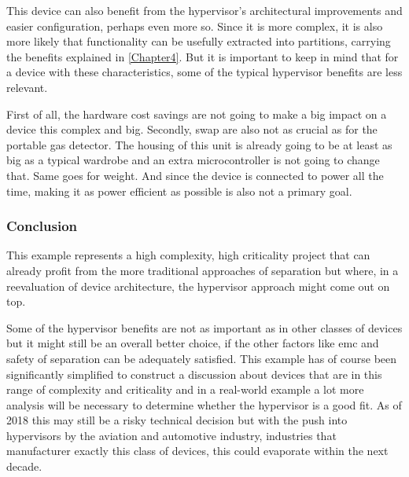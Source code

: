 This device can also benefit from the hypervisor's architectural improvements and easier configuration, perhaps even more so. Since it is more complex, it is also more likely that functionality can be usefully extracted into partitions, carrying the benefits explained in \ref{Chapter4}. But it is important to keep in mind that for a device with these characteristics, some of the typical hypervisor benefits are less relevant.

First of all, the hardware cost savings are not going to make a big impact on a device this complex and big. Secondly, \acrshort{swap} are also not as crucial as for the portable gas detector. The housing of this unit is already going to be at least as big as a typical wardrobe and an extra microcontroller is not going to change that. Same goes for weight. And since the device is connected to power all the time, making it as power efficient as possible is also not a primary goal.

\subsubsection{Conclusion}
This example represents a high complexity, high criticality project that can already profit from the more traditional approaches of separation but where, in a reevaluation of device architecture, the hypervisor approach might come out on top. 

Some of the hypervisor benefits are not as important as in other classes of devices but it might still be an overall better choice, if the other factors like \acrshort{emc} and safety of separation can be adequately satisfied. This example has of course been significantly simplified to construct a discussion about devices that are in this range of complexity and criticality and in a real-world example a lot more analysis will be necessary to determine whether the hypervisor is a good fit. As of 2018 this may still be a risky technical decision but with the push into hypervisors by the aviation and automotive industry, industries that manufacturer exactly this class of devices, this could evaporate within the next decade.

